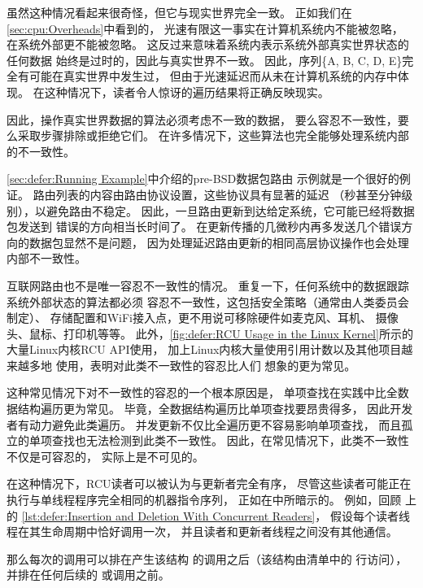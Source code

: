 虽然这种情况看起来很奇怪，但它与现实世界完全一致。
正如我们在\cref{sec:cpu:Overheads}中看到的，
光速有限这一事实在计算机系统内不能被忽略，
在系统外部更不能被忽略。
这反过来意味着系统内表示系统外部真实世界状态的任何数据
始终是过时的，因此与真实世界不一致。
因此，序列\{A, B, C, D, E\}完全有可能在真实世界中发生过，
但由于光速延迟而从未在计算机系统的内存中体现。
在这种情况下，读者令人惊讶的遍历结果将正确反映现实。

因此，操作真实世界数据的算法必须考虑不一致的数据，
要么容忍不一致性，要么采取步骤排除或拒绝它们。
在许多情况下，这些算法也完全能够处理系统内部的不一致性。

\cref{sec:defer:Running Example}中介绍的pre-BSD数据包路由
示例就是一个很好的例证。
路由列表的内容由路由协议设置，这些协议具有显著的延迟
（秒甚至分钟级别），以避免路由不稳定。
因此，一旦路由更新到达给定系统，它可能已经将数据包发送到
错误的方向相当长时间了。
在更新传播的几微秒内再多发送几个错误方向的数据包显然不是问题，
因为处理延迟路由更新的相同高层协议操作也会处理内部不一致性。

互联网路由也不是唯一容忍不一致性的情况。
重复一下，任何系统中的数据跟踪系统外部状态的算法都必须
容忍不一致性，这包括安全策略（通常由人类委员会制定）、
存储配置和WiFi接入点，更不用说可移除硬件如麦克风、耳机、
摄像头、鼠标、打印机等等。
此外，\cref{fig:defer:RCU Usage in the Linux Kernel}所示的
大量Linux内核RCU API使用，
加上Linux内核大量使用引用计数以及其他项目越来越多地
使用，表明对此类不一致性的容忍比人们
想象的更为常见。

这种常见情况下对不一致性的容忍的一个根本原因是，
单项查找在实践中比全数据结构遍历更为常见。
毕竟，全数据结构遍历比单项查找要昂贵得多，
因此开发者有动力避免此类遍历。
并发更新不仅比全遍历更不容易影响单项查找，
而且孤立的单项查找也无法检测到此类不一致性。
因此，在常见情况下，此类不一致性不仅是可容忍的，
实际上是不可见的。

在这种情况下，RCU读者可以被认为与更新者完全有序，
尽管这些读者可能正在执行与单线程程序完全相同的机器指令序列，
正如在中所暗示的。
例如，回顾
上的
\cref{lst:defer:Insertion and Deletion With Concurrent Readers}，
假设每个读者线程在其生命周期中恰好调用一次，
并且读者和更新者线程之间没有其他通信。
\begin{fcvref}
那么每次的调用可以排在产生该结构
的调用之后（该结构由清单中的
行访问），并排在任何后续的
或调用之前。
\end{fcvref}

